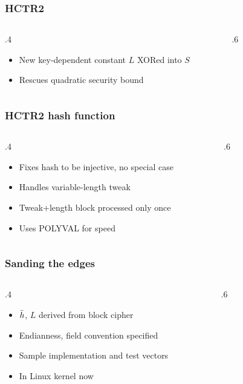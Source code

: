 \documentclass[aspectratio=169]{beamer}
\newenvironment*{figslide}{
    \begin{columns}
        \begin{column}{.4\textwidth}

}{
\end{column}
\begin{column}{.6\textwidth}
    \begin{figure}
        
    \end{figure}
\end{column}
\end{columns}
}
\begin{document}
\togglefalse{oldhctr}
\renewcommand*{\hdiag}{\hgen}

\begin{frame}

\frametitle{HCTR2}
\begin{figslide}
    \begin{itemize}
        \item New key-dependent constant \(L\) XORed into \(S\)
        \item Rescues quadratic security bound
    \end{itemize}
\end{figslide}

\end{frame}

\begin{frame}

\frametitle{HCTR2 hash function}
\begin{figslide}
    \begin{itemize}
        \item Fixes hash to be injective, no special case
        \item Handles variable-length tweak
        \item Tweak+length block processed only once
        \item Uses POLYVAL for speed
    \end{itemize}
\end{figslide}
\end{frame}

\begin{frame}

\frametitle{Sanding the edges}
\begin{figslide}
    \begin{itemize}
        \item \(\bar{h}\), \(L\) derived from block cipher
        \item Endianness, field convention specified
        \item Sample implementation and test vectors
        \item In Linux kernel now
    \end{itemize}

\end{figslide}
\end{frame}
\end{document}
